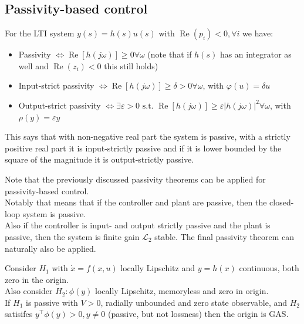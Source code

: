\subsection{Passivity-based control}

\begin{tcolorbox}[colback=white, colframe=teal]
\begin{theorem}
    For the LTI system $y(s)=h(s)u(s)$ with $\operatorname{Re}\left(p_{i}\right)<0, \forall i$ we have:
    \begin{itemize}[topsep=0pt]
        \item Passivity $\Leftrightarrow \operatorname{Re}[h(j \omega)] \geq 0 \forall \omega$ (note that if $h(s)$ has an integrator as well and $\operatorname{Re}\left(z_{i}\right)<0$ this still holds)
        \item Input-strict passivity $\Leftrightarrow \operatorname{Re}[h(j \omega)] \geq \delta>0 \forall \omega$, with $\varphi(u)=\delta u$
        \item Output-strict passivity $\Leftrightarrow \exists \varepsilon>0 \text { s.t. } \operatorname{Re}[h(j \omega)] \geq \varepsilon|h(j \omega)|^{2} \forall \omega$, with $\rho(y)=\varepsilon y$
    \end{itemize}
\end{theorem}
\end{tcolorbox}
\begin{remark}
    This says that with non-negative real part the system is passive, with a strictly positive real part it is input-strictly passive and if it  is lower bounded by the square of the magnitude it is output-strictly passive.
\end{remark}

\begin{remark}
    Note that the previously discussed passivity theorems can be applied for passivity-based control. \\
    Notably that means that if the controller and plant are passive, then the closed-loop system is passive.\\
    Also if the controller is input- and output strictly passive and the plant is passive, then the system is finite gain $\mathscr{L}_2$ stable.
    The final passivity theorem can naturally also be applied.
\end{remark}

\begin{tcolorbox}[colback=white, colframe=teal]
\begin{theorem}
    Consider $H_{1}$ with $\dot{x}=f(x, u)$ locally Lipschitz and $y = h(x)$ continuous, both zero in the origin.\\
     Also consider $H_2 :\phi(y)$ locally Lipschitz, memoryless and zero in origin.\\
     If $H_1$ is passive with $V>0$, radially unbounded and zero state observable, and $H_2$ satisifes $y^{\top} \phi(y) > 0, y \neq 0$ (passive, but not lossness) then the origin is GAS.
\end{theorem}
\end{tcolorbox}

